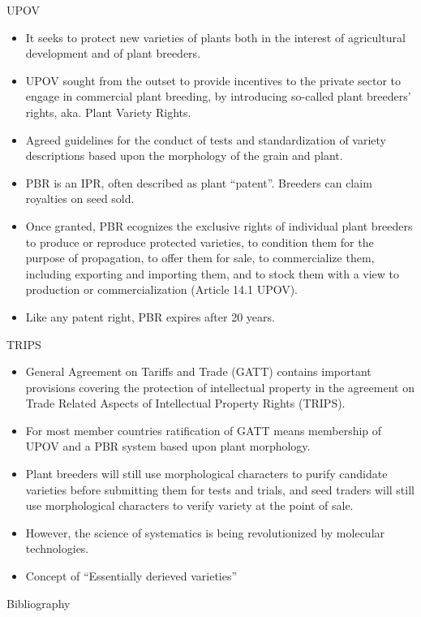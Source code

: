 \documentclass[
  ignorenonframetext,
  aspectratio=169]{beamer}
\newif\ifbibliography
\providecommand{\tightlist}{%
  \setlength{\itemsep}{0pt}\setlength{\parskip}{0pt}}
\begin{document}
\begin{frame}{UPOV}
\protect\hypertarget{upov}{}
\small

\begin{itemize}
\tightlist
\item
  It seeks to protect new varieties of plants both in the interest of
  agricultural development and of plant breeders.
\item
  UPOV sought from the outset to provide incentives to the private
  sector to engage in commercial plant breeding, by introducing
  so-called plant breeders' rights, aka. Plant Variety Rights.
\item
  Agreed guidelines for the conduct of tests and standardization of
  variety descriptions based upon the morphology of the grain and plant.
\item
  PBR is an IPR, often described as plant ``patent''. Breeders can claim
  royalties on seed sold.
\item
  Once granted, PBR ecognizes the exclusive rights of individual plant
  breeders to produce or reproduce protected varieties, to condition
  them for the purpose of propagation, to offer them for sale, to
  commercialize them, including exporting and importing them, and to
  stock them with a view to production or commercialization (Article
  14.1 UPOV).
\item
  Like any patent right, PBR expires after 20 years.
\end{itemize}
\end{frame}

\begin{frame}{TRIPS}
\protect\hypertarget{trips}{}
\begin{itemize}
\tightlist
\item
  General Agreement on Tariffs and Trade (GATT) contains important
  provisions covering the protection of intellectual property in the
  agreement on Trade Related Aspects of Intellectual Property Rights
  (TRIPS).
\item
  For most member countries ratification of GATT means membership of
  UPOV and a PBR system based upon plant morphology.
\item
  Plant breeders will still use morphological characters to purify
  candidate varieties before submitting them for tests and trials, and
  seed traders will still use morphological characters to verify variety
  at the point of sale.
\item
  However, the science of systematics is being revolutionized by
  molecular technologies.
\item
  Concept of ``Essentially derieved varieties''
\end{itemize}
\end{frame}

\renewcommand\refname{Bibliography}
\begin{frame}[allowframebreaks]{Bibliography}
  \bibliographytrue
  
\end{frame}
\end{document}
